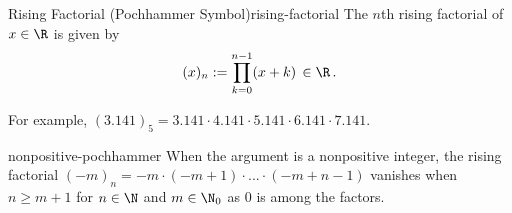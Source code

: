 \begin{definition}{Rising Factorial (Pochhammer Symbol)}{rising-factorial}
  The $n$th rising factorial of $x \in \R$ is given by
  $$(x)_n := \prod_{k=0}^{n-1} (x+k) \,\in \R\,.$$
\end{definition}

For example, $(3.141)_5 = 3.141 \cdot 4.141 \cdot 5.141 \cdot 6.141 \cdot 7.141$.

\begin{remark}{}{nonpositive-pochhammer}
  When the argument is a nonpositive integer, the rising factorial
  $(-m)_n = -m \cdot (-m+1) \cdot ... \cdot (-m+n-1)$
  vanishes when $n \ge m+1$ for $n \in \N$ and $m \in \N_0$ as $0$ is among the factors.
\end{remark}
